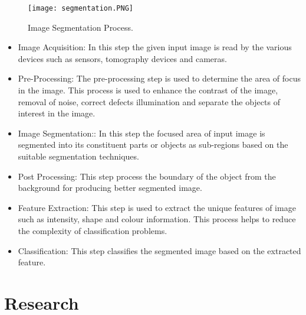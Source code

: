 \documentclass[two column]{ieeeaccess}
\begin{document}
\begin{figure}[h]
    \centering
    \texttt{[image: segmentation.PNG]}
    \caption{Image Segmentation Process.}
    \label{fig10}
\end{figure}
 
\begin{itemize}

    \item Image Acquisition: In this step the given input image is read by the various devices such as sensors, tomography devices and cameras.
    
    \item Pre-Processing: The pre-processing step is used to determine the area of focus in the image. This process is used to enhance the contrast of the image, removal of noise, correct defects illumination and separate the objects of interest in the image. 
    
    \item Image Segmentation:: In this step the focused area of input image is segmented into its constituent parts or objects as sub-regions based on the suitable segmentation techniques.
    
    \item Post Processing:  This step process the boundary of the object from the background for producing better segmented image.
    
    \item Feature Extraction: This step is used to extract the unique features of image such as intensity, shape and colour information. This process helps to reduce the complexity of classification problems.
    
    \item Classification: This step classifies the segmented image based on the extracted feature.
    
\end{itemize}

\section{Research}
\end{document}
